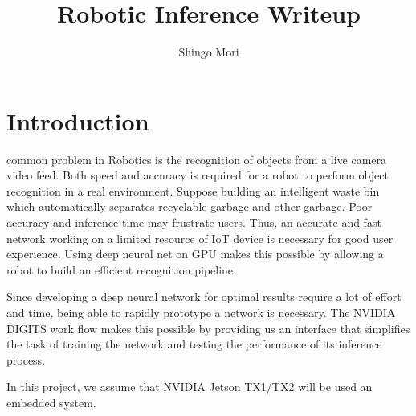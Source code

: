 \documentclass[10pt,journal,compsoc]{IEEEtran}
\begin{document}
\title{Robotic Inference Writeup}

\author{Shingo Mori}

%
{}


\maketitle
\IEEEdisplaynontitleabstractindextext
\IEEEpeerreviewmaketitle
\section{Introduction}
\label{sec:introduction}

 common problem in Robotics is  the recognition of objects from a live camera video feed. Both speed and accuracy is required for a robot to perform object recognition in a real environment. Suppose building an intelligent waste bin which automatically separates recyclable garbage and other garbage. Poor accuracy and inference time may frustrate users. Thus, an accurate and fast network working on a limited resource of IoT device is necessary for good user experience. Using deep neural net on GPU makes this possible by allowing a robot to build an efficient recognition pipeline.

Since developing a deep neural network for optimal results require a lot of effort and time, being able to rapidly prototype a network is necessary. The NVIDIA DIGITS work flow makes this possible by providing us an interface that simplifies the task of training the network and testing the performance of its inference process.

In this project, we assume that NVIDIA Jetson TX1/TX2 will be used an embedded system.
\end{document}
